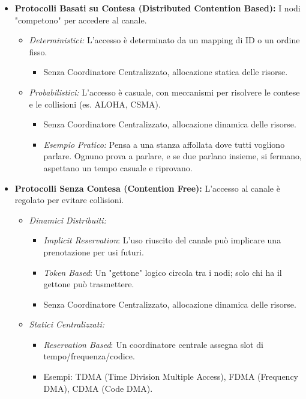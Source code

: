 \begin{itemize}
    \item \textbf{Protocolli Basati su Contesa (Distributed Contention Based):} I nodi "competono" per accedere al canale.
    \begin{itemize}
        \item \textit{Deterministici:} L'accesso è determinato da un mapping di ID o un ordine fisso.
        \begin{itemize}
            \item Senza Coordinatore Centralizzato, allocazione statica delle risorse.
        \end{itemize}
        \item \textit{Probabilistici:} L'accesso è casuale, con meccanismi per risolvere le contese e le collisioni (es. ALOHA, CSMA).
        \begin{itemize}
            \item Senza Coordinatore Centralizzato, allocazione dinamica delle risorse.
            \item \textit{Esempio Pratico:} Pensa a una stanza affollata dove tutti vogliono parlare. Ognuno prova a parlare, e se due parlano insieme, si fermano, aspettano un tempo casuale e riprovano.
        \end{itemize}
    \end{itemize}
    \item \textbf{Protocolli Senza Contesa (Contention Free):} L'accesso al canale è regolato per evitare collisioni.
    \begin{itemize}
        \item \textit{Dinamici Distribuiti:}
        \begin{itemize}
            \item \textit{Implicit Reservation}: L'uso riuscito del canale può implicare una prenotazione per usi futuri.
            \item \textit{Token Based}: Un "gettone" logico circola tra i nodi; solo chi ha il gettone può trasmettere.
            \item Senza Coordinatore Centralizzato, allocazione dinamica delle risorse.
        \end{itemize}
        \item \textit{Statici Centralizzati:}
        \begin{itemize}
            \item \textit{Reservation Based}: Un coordinatore centrale assegna slot di tempo/frequenza/codice.
            \item Esempi: TDMA (Time Division Multiple Access), FDMA (Frequency DMA), CDMA (Code DMA).

\end{itemize}
\end{itemize}
\end{itemize}
